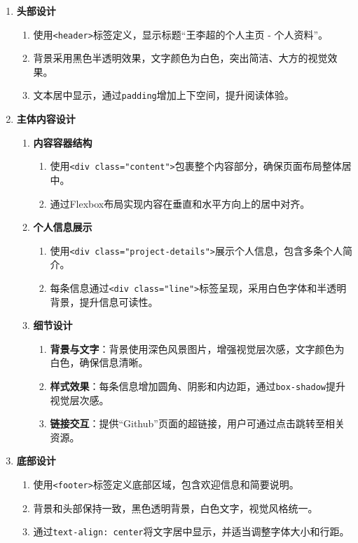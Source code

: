 \documentclass[supercite]{Experimental_Report}
\theoremstyle{definition}
\begin{document}
\begin{enumerate}
    \item \textbf{头部设计}
    \begin{enumerate}
        \item 使用\texttt{<header>}标签定义，显示标题“王李超的个人主页 - 个人资料”。
        \item 背景采用黑色半透明效果，文字颜色为白色，突出简洁、大方的视觉效果。
        \item 文本居中显示，通过\texttt{padding}增加上下空间，提升阅读体验。
    \end{enumerate}

    \item \textbf{主体内容设计}
    \begin{enumerate}
        \item \textbf{内容容器结构}
        \begin{enumerate}
            \item 使用\texttt{<div class="content">}包裹整个内容部分，确保页面布局整体居中。
            \item 通过Flexbox布局实现内容在垂直和水平方向上的居中对齐。
        \end{enumerate}
        
        \item \textbf{个人信息展示}
        \begin{enumerate}
            \item 使用\texttt{<div class="project-details">}展示个人信息，包含多条个人简介。
            \item 每条信息通过\texttt{<div class="line">}标签呈现，采用白色字体和半透明背景，提升信息可读性。
        \end{enumerate}
        
        \item \textbf{细节设计}
        \begin{enumerate}
            \item \textbf{背景与文字}：背景使用深色风景图片，增强视觉层次感，文字颜色为白色，确保信息清晰。
            \item \textbf{样式效果}：每条信息增加圆角、阴影和内边距，通过\texttt{box-shadow}提升视觉层次感。
            \item \textbf{链接交互}：提供“Github”页面的超链接，用户可通过点击跳转至相关资源。
        \end{enumerate}
    \end{enumerate}

    \item \textbf{底部设计}
    \begin{enumerate}
        \item 使用\texttt{<footer>}标签定义底部区域，包含欢迎信息和简要说明。
        \item 背景和头部保持一致，黑色透明背景，白色文字，视觉风格统一。
        \item 通过\texttt{text-align: center}将文字居中显示，并适当调整字体大小和行距。
    \end{enumerate}


\end{enumerate}
\end{document}
